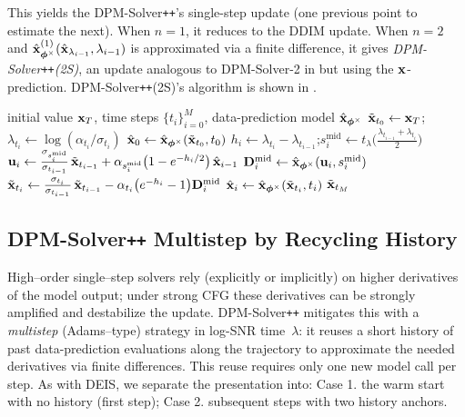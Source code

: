This yields the DPM-Solver\texttt{++}'s single-step update (one previous point to estimate the next). When $n=1$, it reduces to the DDIM update. When $n=2$ and $\hat{{\mathbf{x}}}_{{\bm{\phi}}^\times}^{(1)}(\hat{{\mathbf{x}}}_{\lambda_{i-1}}, \lambda_{i-1})$ is approximated via a finite difference, it gives \emph{DPM-Solver\texttt{++}(2S)}, an update analogous to DPM-Solver-2 in  but using the ${\mathbf{x}}$-prediction. DPM-Solver\texttt{++}(2S)’s algorithm is shown in .
\begin{algorithm}[H]
    \centering
    \caption{DPM-Solver\texttt{++}(2S): a midpoint special case.}
    \label{alg:dpmpp-2s-mid}
    \begin{algorithmic}[1]
    \Require initial value ${\mathbf{x}}_T$, time steps $\{t_i\}_{i=0}^M$, data-prediction model $\hat{{\mathbf{x}}}_{{\bm{\phi}}^\times}$
    \State $\tilde{{\mathbf{x}}}_{t_0}\gets{\mathbf{x}}_T$;\quad $\lambda_{t_i}\gets \log(\alpha_{t_i}/\sigma_{t_i})$ 
    \State $\hat{{\mathbf{x}}}_0 \gets \hat{{\mathbf{x}}}_{{\bm{\phi}}^\times}(\tilde{{\mathbf{x}}}_{t_0},t_0)$ 
        \State $h_i \gets \lambda_{t_i}-\lambda_{t_{i-1}}$;\quad $s_i^{\text{mid}} \gets t_{\lambda} \Big(\tfrac{\lambda_{t_{i-1}}+\lambda_{t_i}}{2}\Big)$
        \State ${\mathbf{u}}_i \gets \tfrac{\sigma_{s_i^{\text{mid}}}}{\sigma_{t_{i-1}}}\,\tilde{{\mathbf{x}}}_{t_{i-1}}
                 + \alpha_{s_i^{\text{mid}}}\big(1-e^{-h_i/2}\big)\,\hat{{\mathbf{x}}}_{i-1}$ 
        \State ${\mathbf{D}}_i^{\mathrm{mid}} \gets \hat{{\mathbf{x}}}_{{\bm{\phi}}^\times}({\mathbf{u}}_i,s_i^{\text{mid}})$ 
        \State $\tilde{{\mathbf{x}}}_{t_i} \gets \tfrac{\sigma_{t_i}}{\sigma_{t_{i-1}}}\,\tilde{{\mathbf{x}}}_{t_{i-1}}
               - \alpha_{t_i}\big(e^{-h_i}-1\big){\mathbf{D}}_i^{\mathrm{mid}}$ 
        \State $\hat{{\mathbf{x}}}_i \gets \hat{{\mathbf{x}}}_{{\bm{\phi}}^\times}(\tilde{{\mathbf{x}}}_{t_i},t_i)$ 
    \EndFor
    \State \Return $\tilde{{\mathbf{x}}}_{t_M}$
    \end{algorithmic}
\end{algorithm}





\subsection{DPM-Solver\texttt{++} Multistep by Recycling History}\label{subsec:dpm-solver++-multi}
High–order single–step solvers rely (explicitly or implicitly) on higher derivatives of the model output; under strong CFG these derivatives can be strongly amplified and destabilize the update. 
DPM-Solver\texttt{++} mitigates this with a \emph{multistep} (Adams–type) strategy in log-SNR time~$\lambda$: it reuses a short history of past data-prediction evaluations along the trajectory to approximate the needed derivatives via finite differences. 
This reuse requires only one new model call per step. 
As with DEIS, we separate the presentation into: Case 1. the warm start with no history (first step); Case 2. subsequent steps with two history anchors.


